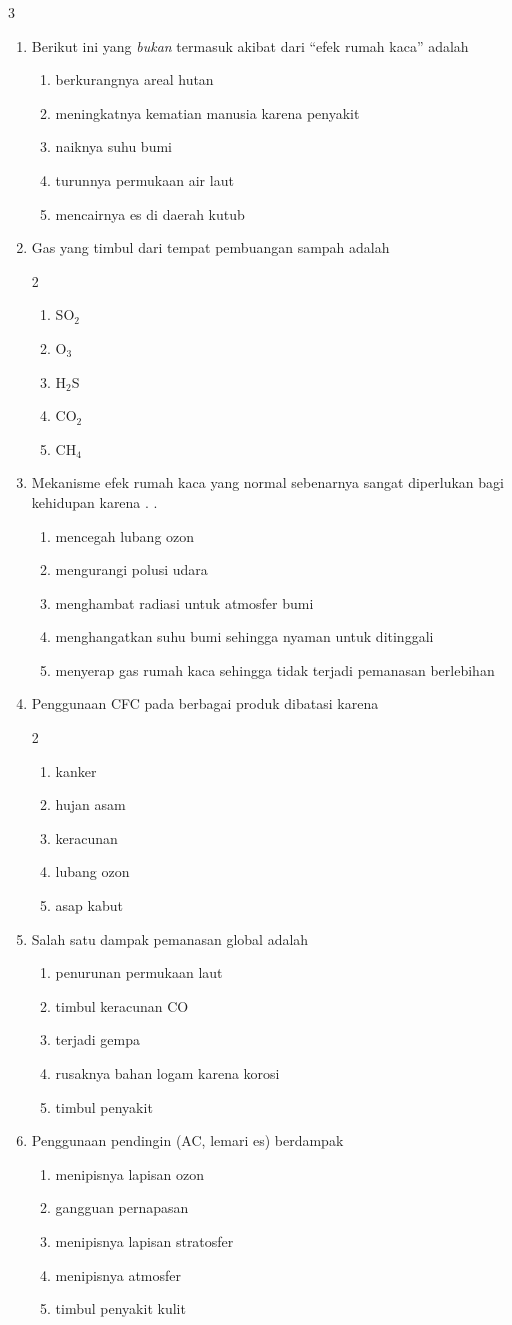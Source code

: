\documentclass[10pt,a4paper]{extarticle}
\newcommand*\pilgan[1]{
\begin{enumerate}[label=\Alph*., itemsep=0pt,topsep=0pt,leftmargin=*,align=Center] #1 
\end{enumerate}}
\newcommand{\pilgani}[1]{                            \vspace{-0.3cm}\begin{multicols}{2}
 \begin{enumerate}[label=\Alph*., itemsep=0pt,topsep=0pt,leftmargin=*,align=Center]#1                     \end{enumerate}
 \phantom{ini cuma sapi, wedus, dan ayam}
 \end{multicols}}
\begin{document}
\begin{multicols}{3}
\begin{enumerate}
\item Berikut ini yang \textit{bukan} termasuk akibat dari ``efek rumah kaca'' adalah
\pilgan{
\item berkurangnya areal hutan
\item meningkatnya kematian manusia karena penyakit
\item naiknya suhu bumi
\item turunnya permukaan air laut
\item mencairnya es di daerah kutub}

\item Gas yang timbul dari tempat pembuangan sampah adalah 
\pilgani{
\item SO$_2$
\item O$_3$
\item H$_2$S
\item CO$_2$
\item CH$_4$
}

\item Mekanisme efek rumah kaca yang normal sebenarnya sangat diperlukan bagi kehidupan karena . .
\pilgan{
\item mencegah lubang ozon
\item mengurangi polusi udara
\item menghambat radiasi untuk atmosfer bumi
\item menghangatkan suhu bumi sehingga nyaman untuk ditinggali
\item menyerap gas rumah kaca sehingga tidak terjadi pemanasan berlebihan }

\item Penggunaan CFC pada berbagai produk dibatasi karena
\pilgani{
\item kanker
\item hujan asam
\item keracunan
\item lubang ozon
\item asap kabut}


\item Salah satu dampak pemanasan global adalah
\pilgan{
\item penurunan permukaan laut
\item timbul keracunan CO
\item terjadi gempa
\item rusaknya bahan logam karena korosi
\item timbul penyakit}

\item Penggunaan pendingin (AC, lemari es) berdampak
\pilgan{
\item menipisnya lapisan ozon
\item gangguan pernapasan
\item menipisnya lapisan stratosfer
\item menipisnya atmosfer
\item timbul penyakit kulit}


\end{enumerate}
\end{multicols}
\end{document}
